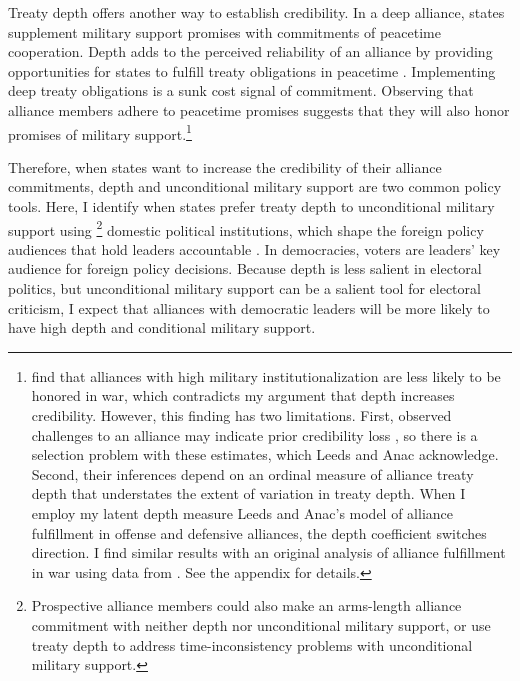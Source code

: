 \documentclass[12pt]{article}
\begin{document}


Treaty depth offers another way to establish credibility.
In a deep alliance, states supplement military support promises with commitments of peacetime cooperation.  
Depth adds to the perceived reliability of an alliance by providing opportunities for states to fulfill treaty obligations in peacetime \citep{Morrow1994}. 
Implementing deep treaty obligations is a sunk cost signal of commitment.
Observing that alliance members adhere to peacetime promises suggests that they will also honor promises of military support.\footnote{\citet{LeedsAnac2005} find that alliances with high military institutionalization are less likely to be honored in war, which contradicts my argument that depth increases credibility. 
However, this finding has two limitations. 
First, observed challenges to an alliance may indicate prior credibility loss \citep{Smith1995}, so there is a selection problem with these estimates, which Leeds and Anac acknowledge. 
Second, their inferences depend on an ordinal measure of alliance treaty depth that understates the extent of variation in treaty depth. 
When I employ my latent depth measure Leeds and Anac's model of alliance fulfillment in offense and defensive alliances, the depth coefficient switches direction. 
I find similar results with an original analysis of alliance fulfillment in war using data from \citet{BerkemeierFuhrmann2018}.
See the appendix for details.} 


Therefore, when states want to increase the credibility of their alliance commitments, depth and unconditional military support are two common policy tools. 
Here, I identify when states prefer treaty depth to unconditional military support using \footnote{Prospective alliance members could also make an arms-length alliance commitment with neither depth nor unconditional military support, or use treaty depth to address time-inconsistency problems with unconditional military support.} domestic political institutions, which shape the foreign policy audiences that hold leaders accountable \citep{HydeSaunders2020}. 
In democracies, voters are leaders' key audience for foreign policy decisions.  
Because depth is less salient in electoral politics, but unconditional military support can be a salient tool for electoral criticism, I expect that alliances with democratic leaders will be more likely to have high depth and conditional military support. 
\end{document}

